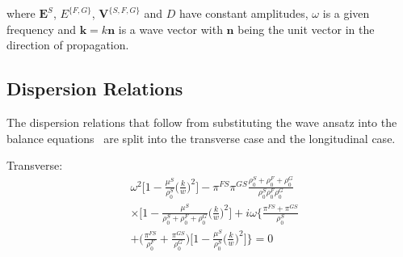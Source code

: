 \documentclass[twocolumn]{article}
\begin{document}
where $\textbf{E}^S$, $E^{\{F,G\}}$, $\textbf{V}^{\{S, F, G\}}$ and $D$ have constant amplitudes, $\omega$ is a given frequency and $\textbf{k} = k\textbf{n}$ is a wave vector with $\textbf{n}$ being the unit vector in the direction of propagation.

\subsection{Dispersion Relations}
The dispersion relations that follow from substituting the wave ansatz into the balance equations~\cite{detmann_num_sim_2008} are split into the transverse case and the longitudinal case.

Transverse:
\begin{align*}
     & \omega^2\bigl[1 - \frac{\mu^S}{\rho_0^S}\bigl(\frac{k}{w}\bigr)^2\bigr]
    -\pi^{FS}\pi^{GS}\frac{\rho_0^S + \rho_0^F + \rho_0^G}{\rho_0^S\rho_0^F\rho_0^G}             \\
     & \times\bigl[1-\frac{\mu^S}{\rho_0^S + \rho_0^F + \rho_0^G}\bigl(\frac{k}{w}\bigr)^2\bigr]
    +i\omega\bigl\{\frac{\pi^{FS} + \pi^{GS}}{\rho_0^S}                                          \\
     & + \bigl(\frac{\pi^{FS}}{\rho_0^F} + \frac{\pi^{GS}}{\rho_0^G}\bigr)
    \bigl[1-\frac{\mu^S}{\rho_0^S}\bigl(\frac{k}{w}\bigr)^2\bigr]\bigr\} = 0
\end{align*}
\end{document}
